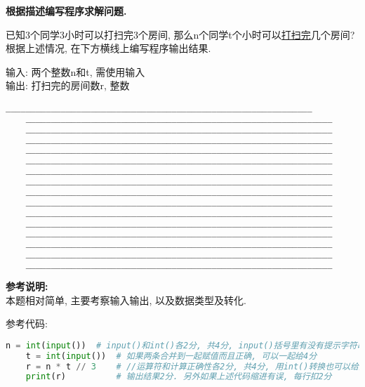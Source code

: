 \documentclass[hideanswer=true,
enfont=empty,	%
zhfont=empty,	%
mathfont=newtxmath,
]{cmcthesis}
\begin{document}
\begin{problem}
	\textbf{根据描述编写程序求解问题.{}}
	
	已知3个同学3小时可以打扫完3个房间, 那么n个同学t个小时可以\underline{打扫完}几个房间? 根据上述情况, 在下方横线上编写程序输出结果.

	输入: 两个整数n和t, 需使用输入\\
	输出: 打扫完的房间数r, 整数
	
	\begin{lstlisting}[style=tex, language=python]
	_____________________________________________________________
	_____________________________________________________________
	_____________________________________________________________
	_____________________________________________________________
	_____________________________________________________________
	_____________________________________________________________
	_____________________________________________________________
	_____________________________________________________________
	_____________________________________________________________
	_____________________________________________________________
	_____________________________________________________________
	_____________________________________________________________
	_____________________________________________________________
	_____________________________________________________________
	_____________________________________________________________
	_____________________________________________________________
	\end{lstlisting}
\end{problem}

\begin{answer}
	\textbf{参考说明:}\\
	本题相对简单, 主要考察输入输出, 以及数据类型及转化.
	
	参考代码:
	\begin{lstlisting}[style=tex, language=python]
    n = int(input())  # input()和int()各2分, 共4分, input()括号里有没有提示字符串都可以给分
    t = int(input())  # 如果两条合并到一起赋值而且正确, 可以一起给4分
    r = n * t // 3    # //运算符和计算正确性各2分, 共4分, 用int()转换也可以给分
    print(r)          # 输出结果2分. 另外如果上述代码缩进有误, 每行扣2分
	\end{lstlisting}


\end{answer}
\end{document}

